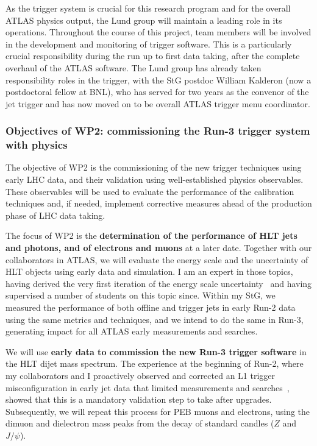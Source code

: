 As the trigger system is crucial for this research program and for the overall ATLAS physics output, the Lund group will maintain a leading role in its operations. 
Throughout the course of this project, team members will be involved in the development and monitoring of trigger software. 
This is a particularly crucial responsibility during the run up to first data taking, after the complete overhaul of the ATLAS software. 
The Lund group has already taken responsibility roles in the trigger, with the StG postdoc William Kalderon (now a postdoctoral fellow at BNL), who has served for two years as the convenor of the jet trigger and has now moved on to be overall ATLAS trigger menu coordinator. 

\subsubsection{Objectives of WP2: commissioning the Run-3 trigger system with physics}

The objective of WP2 is the commissioning of the new trigger techniques using early LHC data, and their validation using well-established physics observables. 
These observables will be used to evaluate the performance of the calibration techniques and, if needed, implement corrective measures ahead of the production phase of LHC data taking. 

The focus of WP2 is the \textbf{determination of the performance of HLT jets and photons, and of electrons and muons} at a later date. 
Together with our collaborators in ATLAS, we will evaluate the energy scale and the uncertainty of HLT objects using early data and simulation. 
I am an expert in those topics, having derived the very first iteration of the energy scale uncertainty~\cite{ToBeCited} %
and having supervised a number of students on this topic since. 
Within my StG, we measured the performance of both offline and trigger jets in early Run-2 data using the same metrics and techniques, 
and we intend to do the same in Run-3, generating impact for all ATLAS early measurements and searches.  

We will use \textbf{early data to commission the new Run-3 trigger software} in the HLT dijet mass spectrum. 
The experience at the beginning of Run-2, where my collaborators and I proactively observed and corrected an L1 trigger misconfiguration in early jet data that limited measurements and searches~\cite{Collaboration:2035503}, showed that this is a mandatory validation step to take after upgrades. 
Subsequently, we will repeat this process for PEB muons and electrons, using the dimuon and dielectron mass peaks from the decay of standard candles ($Z$ and $J/\psi$). 

